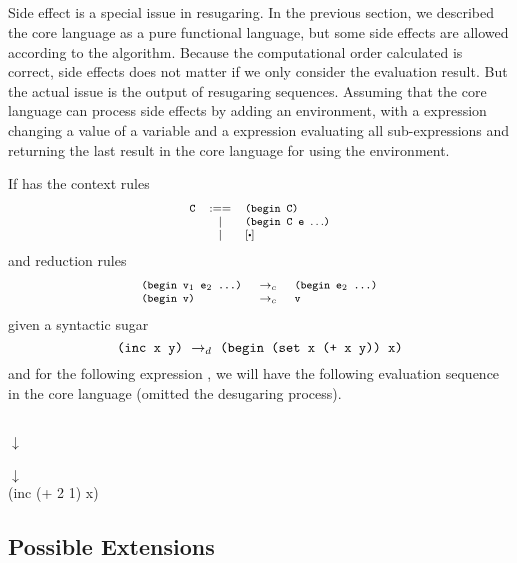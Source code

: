 \subsection{}


Side effect is a special issue in resugaring. In the previous section, we described the core language as a pure functional language, but some side effects are allowed according to the algorithm. Because the computational order calculated is correct, side effects does not matter if we only consider the evaluation result. But the actual issue is the output of resugaring sequences. Assuming that the core language can process side effects by adding an environment, with a  expression changing a value of a variable and a  expression evaluating all sub-expressions and returning the last result in the core language for using the environment.

If  has the context rules
\[
	{\footnotesize
	\begin{array}{lcl}
		\Code{C}&:==&\Code{(\m{begin~C})}\\
		& | &\Code{(\m{begin~C~e~$\ldots$})}\\
		& | &[\bigcdot]
	\end{array}
	}
\]
and reduction rules
\[
{\footnotesize
		\begin{array}{lcl}
		\texttt{(begin~$\mbox{\tt v}_1$~$\mbox{\tt e}_2$~...)} &~\rightarrow_c~& \texttt{(begin~$\mbox{\tt e}_2$~...)}\\
		\texttt{(begin~v)} &~\rightarrow_c~& \texttt{v}\\
		\end{array}
}
\]
given a syntactic sugar 
\[\texttt{(inc x y)} ~\rightarrow_d~ \texttt{(begin (set x (+ x y)) x)}\]
and for the following expression , we will have the following evaluation sequence in the core language (omitted the desugaring process).
\begin{center}
	\\
	$\downarrow$\\
	\\
	$\downarrow$\\
	 {\footnotesize (inc (+ 2 1) x)}\\

\end{center}
\todo{}



\subsection{Possible Extensions}

